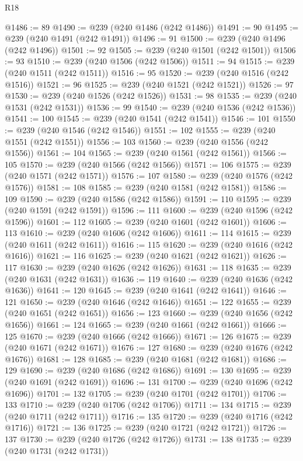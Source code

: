 \begin{lexlean}{R18}
\begin{coremodule}
@1486 := 89
@1490 := @239 (@240 @1486 (@242 @1486))
@1491 := 90
@1495 := @239 (@240 @1491 (@242 @1491))
@1496 := 91
@1500 := @239 (@240 @1496 (@242 @1496))
@1501 := 92
@1505 := @239 (@240 @1501 (@242 @1501))
@1506 := 93
@1510 := @239 (@240 @1506 (@242 @1506))
@1511 := 94
@1515 := @239 (@240 @1511 (@242 @1511))
@1516 := 95
@1520 := @239 (@240 @1516 (@242 @1516))
@1521 := 96
@1525 := @239 (@240 @1521 (@242 @1521))
@1526 := 97
@1530 := @239 (@240 @1526 (@242 @1526))
@1531 := 98
@1535 := @239 (@240 @1531 (@242 @1531))
@1536 := 99
@1540 := @239 (@240 @1536 (@242 @1536))
@1541 := 100
@1545 := @239 (@240 @1541 (@242 @1541))
@1546 := 101
@1550 := @239 (@240 @1546 (@242 @1546))
@1551 := 102
@1555 := @239 (@240 @1551 (@242 @1551))
@1556 := 103
@1560 := @239 (@240 @1556 (@242 @1556))
@1561 := 104
@1565 := @239 (@240 @1561 (@242 @1561))
@1566 := 105
@1570 := @239 (@240 @1566 (@242 @1566))
@1571 := 106
@1575 := @239 (@240 @1571 (@242 @1571))
@1576 := 107
@1580 := @239 (@240 @1576 (@242 @1576))
@1581 := 108
@1585 := @239 (@240 @1581 (@242 @1581))
@1586 := 109
@1590 := @239 (@240 @1586 (@242 @1586))
@1591 := 110
@1595 := @239 (@240 @1591 (@242 @1591))
@1596 := 111
@1600 := @239 (@240 @1596 (@242 @1596))
@1601 := 112
@1605 := @239 (@240 @1601 (@242 @1601))
@1606 := 113
@1610 := @239 (@240 @1606 (@242 @1606))
@1611 := 114
@1615 := @239 (@240 @1611 (@242 @1611))
@1616 := 115
@1620 := @239 (@240 @1616 (@242 @1616))
@1621 := 116
@1625 := @239 (@240 @1621 (@242 @1621))
@1626 := 117
@1630 := @239 (@240 @1626 (@242 @1626))
@1631 := 118
@1635 := @239 (@240 @1631 (@242 @1631))
@1636 := 119
@1640 := @239 (@240 @1636 (@242 @1636))
@1641 := 120
@1645 := @239 (@240 @1641 (@242 @1641))
@1646 := 121
@1650 := @239 (@240 @1646 (@242 @1646))
@1651 := 122
@1655 := @239 (@240 @1651 (@242 @1651))
@1656 := 123
@1660 := @239 (@240 @1656 (@242 @1656))
@1661 := 124
@1665 := @239 (@240 @1661 (@242 @1661))
@1666 := 125
@1670 := @239 (@240 @1666 (@242 @1666))
@1671 := 126
@1675 := @239 (@240 @1671 (@242 @1671))
@1676 := 127
@1680 := @239 (@240 @1676 (@242 @1676))
@1681 := 128
@1685 := @239 (@240 @1681 (@242 @1681))
@1686 := 129
@1690 := @239 (@240 @1686 (@242 @1686))
@1691 := 130
@1695 := @239 (@240 @1691 (@242 @1691))
@1696 := 131
@1700 := @239 (@240 @1696 (@242 @1696))
@1701 := 132
@1705 := @239 (@240 @1701 (@242 @1701))
@1706 := 133
@1710 := @239 (@240 @1706 (@242 @1706))
@1711 := 134
@1715 := @239 (@240 @1711 (@242 @1711))
@1716 := 135
@1720 := @239 (@240 @1716 (@242 @1716))
@1721 := 136
@1725 := @239 (@240 @1721 (@242 @1721))
@1726 := 137
@1730 := @239 (@240 @1726 (@242 @1726))
@1731 := 138
@1735 := @239 (@240 @1731 (@242 @1731))

\end{coremodule}
\end{lexlean}
